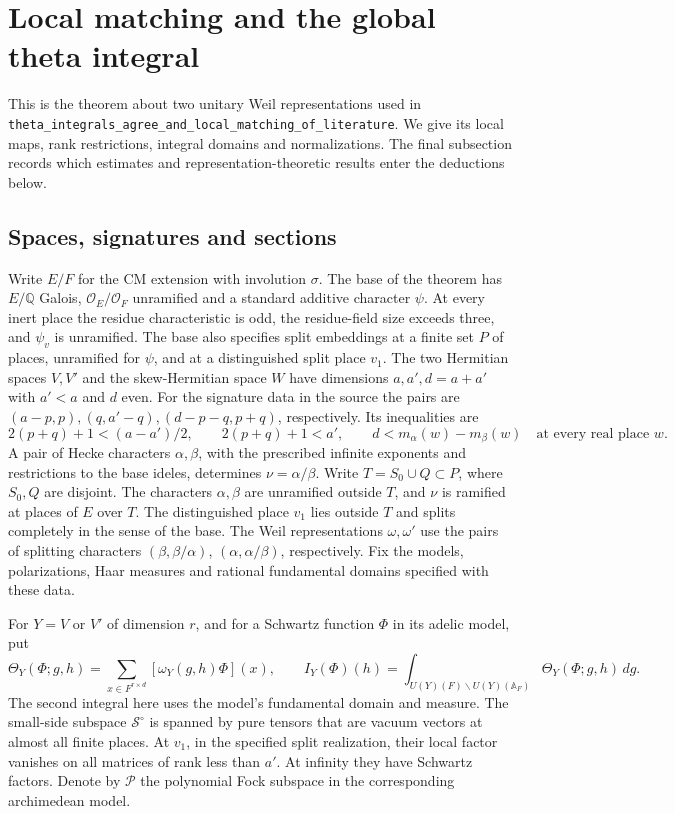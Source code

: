 \section{Local matching and the global theta integral}
\label{sec:theta-match}

This is the theorem about two unitary Weil representations used in
\texttt{theta\_\allowbreak{}integrals\_\allowbreak{}agree\_\allowbreak{}and\_\allowbreak{}local\_\allowbreak{}matching\_\allowbreak{}of\_\allowbreak{}literature}.
We give its local maps, rank restrictions, integral domains and
normalizations. The final subsection records which estimates and
representation-theoretic results enter the deductions below.

\subsection{Spaces, signatures and sections}

Write \(E/F\) for the CM extension with involution \(\sigma\).
The base of the theorem has \(E/\mathbb Q\) Galois,
\(\mathcal O_E/\mathcal O_F\) unramified and a standard additive
character \(\psi\). At every inert place the residue characteristic
is odd, the residue-field size exceeds three, and \(\psi_v\) is
unramified. The base also specifies split embeddings at a finite
set \(P\) of places, unramified for \(\psi\), and at a distinguished
split place \(v_1\). The two Hermitian spaces \(V,V'\) and the
skew-Hermitian space \(W\) have dimensions \(a,a',d=a+a'\) with
\(a'<a\) and \(d\) even. For the signature data in the source the
pairs are \((a-p,p),(q,a'-q),(d-p-q,p+q)\), respectively. Its
inequalities are
\[
 2(p+q)+1<(a-a')/2,\qquad 2(p+q)+1<a',\qquad
 d<m_\alpha(w)-m_\beta(w)\quad\text{at every real place }w .
\]
A pair of Hecke characters \(\alpha,\beta\), with the prescribed
infinite exponents and restrictions to the base ideles, determines
\(\nu=\alpha/\beta\). Write \(T=S_0\cup Q\subset P\), where \(S_0,Q\)
are disjoint. The characters \(\alpha,\beta\) are unramified outside
\(T\), and \(\nu\) is ramified at places of \(E\) over \(T\).
The distinguished place \(v_1\) lies outside \(T\) and splits
completely in the sense of the base. The Weil representations
\(\omega,\omega'\) use the pairs of splitting characters
\((\beta,\beta/\alpha)\), \((\alpha,\alpha/\beta)\), respectively.
Fix the models, polarizations, Haar measures and rational fundamental
domains specified with these data.

For \(Y=V\) or \(V'\) of dimension \(r\), and for a Schwartz
function \(\Phi\) in its adelic model, put
\[
 \Theta_Y(\Phi;g,h)=
   \sum_{x\in F^{r\times d}}[\omega_Y(g,h)\Phi](x),\qquad
 I_Y(\Phi)(h)=
   \int_{U(Y)(F)\backslash U(Y)(\mathbb A_F)}
         \Theta_Y(\Phi;g,h)\,dg .
\]
The second integral here uses the model's fundamental domain and measure.
The small-side subspace \(\mathcal S^\circ\) is spanned by pure tensors
that are vacuum vectors at almost all finite places. At \(v_1\), in
the specified split realization, their local factor vanishes on all
matrices of rank less than \(a'\). At infinity they have Schwartz
factors. Denote by \(\mathcal P\) the polynomial Fock subspace
in the corresponding archimedean model.

